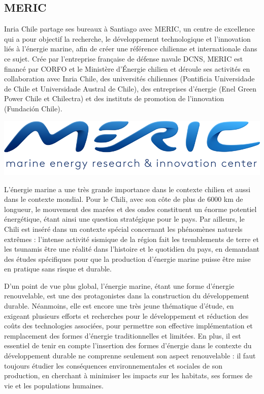 \subsection{MERIC}

\indent Inria Chile partage ses bureaux à Santiago avec MERIC, un centre de excellence qui a pour objectif la recherche, le développement technologique et l'innovation liés à l'énergie marine, afin de créer une référence chilienne et internationale dans ce sujet. Crée par l'entreprise française de défense navale DCNS, MERIC est financé par CORFO et le Ministère d'Énergie chilien et déroule ses activités en collaboration avec Inria Chile, des universités chiliennes (Pontificia Universidade de Chile et Universidade Austral de Chile), des entreprises d'énergie (Enel Green Power Chile et Chilectra) et des instituts de promotion de l'innovation (Fundación Chile).  

\indent
\begingroup
\centering
\includegraphics[scale=.3]{figures/logos/meric.png}
\endgroup

\indent L'énergie marine a une très grande importance dans le contexte chilien et aussi dans le contexte mondial. Pour le Chili, avec son côte de plus de 6000 km de longueur, le mouvement des marées et des ondes constituent un énorme potentiel énergétique, étant ainsi une question stratégique pour le pays. Par ailleurs, le Chili est inséré dans un contexte spécial concernant les phénomènes naturels extrêmes : l'intense activité sismique de la région fait les tremblements de terre et les tsunamis être une réalité dans l'histoire et le quotidien du pays, en demandant des études spécifiques pour que la production d'énergie marine puisse être mise en pratique sans risque et durable.

\indent D'un point de vue plus global, l'énergie marine, étant une forme d'énergie renouvelable, est une des protagonistes dans la construction du développement durable. Néanmoins, elle est encore une très jeune thématique d'étude, en exigeant plusieurs efforts et recherches pour le développement et réduction des coûts des technologies associées, pour permettre son effective implémentation et remplacement des formes d'énergie traditionnelles et limitées. En plus, il est essentiel de tenir en compte l'insertion des formes d'énergie dans le contexte du développement durable ne comprenne seulement son aspect renouvelable : il faut toujours étudier les conséquences environnementales et sociales de son production, en cherchant à minimiser les impacts sur les habitats, ses formes de vie et les populations humaines.


